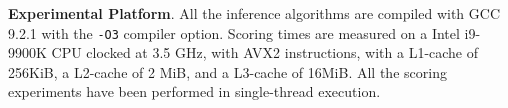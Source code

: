 
\smallskip
\noindent \textbf{Experimental Platform}. 
All the inference algorithms are compiled with GCC 9.2.1 with the \texttt{-O3} compiler option. 
Scoring times are measured on a Intel i9-9900K CPU clocked at 3.5 GHz, with AVX2 instructions, with a L1-cache of 256KiB, a L2-cache of 2 MiB, and a L3-cache of 16MiB. All the scoring experiments have been performed in single-thread execution.





